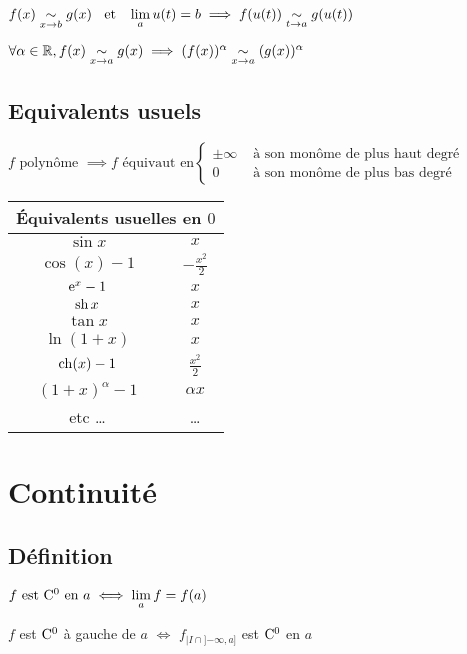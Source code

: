 \begin{prp}
$f(x) \equ[x \to b] g(x) \et \lm_a u(t) = b 
\implies f(u(t)) \equ[t \to a] g(u(t))$
\end{prp}

\begin{prp}
$\forall \alpha \in \R, f(x) \equ[x \to a] g(x)
\implies (f(x))^\alpha \equ[x \to a] (g(x))^\alpha$
\end{prp}

\subsection{Equivalents usuels}
$
f \text{ polynôme } \implies
f \text{ équivaut en}
\begin{cases}
\pm \infty  &\text{ à son monôme de plus haut degré} \\
0           &\text{ à son monôme de plus bas degré}
\end{cases}
$

\begin{tabular}{|c|c|}
\hline
\multicolumn{2}{|c|}{\'Equivalents usuelles en $0$} \\
\hline
$\sin x$ & $x$ \\
\hline
$\cos(x) - 1$ & $-\frac{x^2}{2}$ \\
\hline
$\ex^x - 1$ & $x$ \\
\hline
$\sh x $ & $x$ \\
\hline
$\tan x $ & $x$ \\
\hline
$\ln(1 + x)$ & $x$ \\
\hline
$\ch(x) - 1$ & $\frac{x^2}{2}$ \\
\hline
$(1 + x)^\alpha - 1$ & $\alpha x$ \\
\hline
etc \ldots & \ldots \\
\hline
\end{tabular}

\section{Continuité}

\subsection{Définition}

\begin{dfn}
$f \text{ est } \co{0} \text{ en } a \iff \lm_a f = f(a)$
\end{dfn}

\begin{dfn}
$f$ est $\co{0}$ à gauche de $a$ $\iff$ $f_{|I\cap{]{-\infty},a]}}$ est
$\co{0}$ en $a$
\end{dfn}

